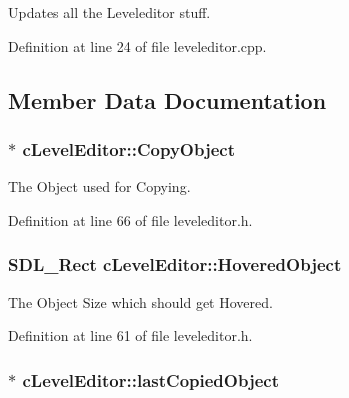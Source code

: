 Updates all the Leveleditor stuff. 



Definition at line 24 of file leveleditor.\-cpp.



\subsection{Member Data Documentation}
\hypertarget{classc_level_editor_a5755a1e20a4f0d867a3f00099776f463}{
\subsubsection[{Copy\-Object}]{$\ast$ c\-Level\-Editor\-::\-Copy\-Object}}\label{classc_level_editor_a5755a1e20a4f0d867a3f00099776f463}


The Object used for Copying. 



Definition at line 66 of file leveleditor.\-h.

\hypertarget{classc_level_editor_af8cfd884c7e53979b9779adfeb565db0}{
\subsubsection[{Hovered\-Object}]{\setlength{\rightskip}{0pt plus 5cm}S\-D\-L\-\_\-\-Rect c\-Level\-Editor\-::\-Hovered\-Object}}\label{classc_level_editor_af8cfd884c7e53979b9779adfeb565db0}


The Object Size which should get Hovered. 



Definition at line 61 of file leveleditor.\-h.

\hypertarget{classc_level_editor_afc34d3213256e56166d2e63f6f99c7c5}{
\subsubsection[{last\-Copied\-Object}]{$\ast$ c\-Level\-Editor\-::last\-Copied\-Object}}\label{classc_level_editor_afc34d3213256e56166d2e63f6f99c7c5}


